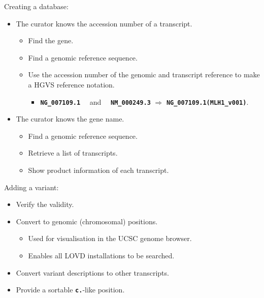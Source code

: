 \documentclass[a4, portrait]{seminar}
\newcommand{\bt}[1]{\texttt{\textbf{#1}}}
\begin{document}
\begin{slide}

  Creating a database:
  \begin{itemize}
    \item The curator knows the accession number of a transcript.
    \begin{itemize}
      \item Find the gene.
      \item Find a genomic reference sequence.
      \item Use the accession number of the genomic and transcript reference to
        make a HGVS reference notation.
      \begin{itemize}
        \item \bt{NG\_007109.1} \ \  and \ \ \bt{NM\_000249.3} $\Rightarrow$ 
          \bt{NG\_007109.1(MLH1\_v001)}.
      \end{itemize}
    \end{itemize}
    \item The curator knows the gene name.
    \begin{itemize}
      \item Find a genomic reference sequence.
      \item Retrieve a list of transcripts.
      \item Show product information of each transcript.
    \end{itemize}
  \end{itemize}

  \vfill
\end{slide}

\begin{slide}

  Adding a variant:
  \begin{itemize}
    \item Verify the validity.
    \item Convert to genomic (chromosomal) positions.
    \begin{itemize}
      \item Used for visualisation in the UCSC genome browser.
      \item Enables all LOVD installations to be searched.
    \end{itemize}
    \item Convert variant descriptions to other transcripts.
    \item Provide a sortable \bt{c.}-like position.
  \end{itemize}

  \vfill
\end{slide}
\end{document}
